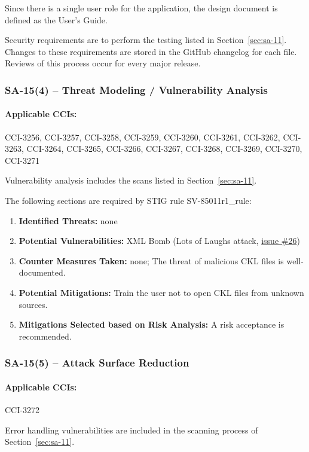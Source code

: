 \documentclass[letterpaper, 10pt, twoside]{article}
\begin{document}
Since there is a single user role for the application, the design document is defined as the User's Guide.

Security requirements are to perform the testing listed in Section~\ref{sec:sa-11}. Changes to these requirements are stored in the GitHub changelog for each file. Reviews of this process occur for every major release.

\subsubsection{SA-15(4) -- Threat Modeling / Vulnerability Analysis}

\paragraph{Applicable CCIs:} CCI-3256, CCI-3257, CCI-3258, CCI-3259, CCI-3260, CCI-3261, CCI-3262, CCI-3263, CCI-3264, CCI-3265, CCI-3266, CCI-3267, CCI-3268, CCI-3269, CCI-3270, CCI-3271

Vulnerability analysis includes the scans listed in Section~\ref{sec:sa-11}.

The following sections are required by STIG rule SV-85011r1\_rule:
\begin{enumerate}
	\item \textbf{Identified Threats:} none
	\item \textbf{Potential Vulnerabilities:} XML Bomb (Lots of Laughs attack, \href{https://github.com/squinky86/STIGQter/issues/26}{issue \#26})
	\item \textbf{Counter Measures Taken:} none; The threat of malicious CKL files is well-documented.
	\item \textbf{Potential Mitigations:} Train the user not to open CKL files from unknown sources.
	\item \textbf{Mitigations Selected based on Risk Analysis:} A risk acceptance is recommended.
\end{enumerate}

\subsubsection{SA-15(5) -- Attack Surface Reduction}

\paragraph{Applicable CCIs:} CCI-3272

Error handling vulnerabilities are included in the scanning process of Section~\ref{sec:sa-11}.
\end{document}
